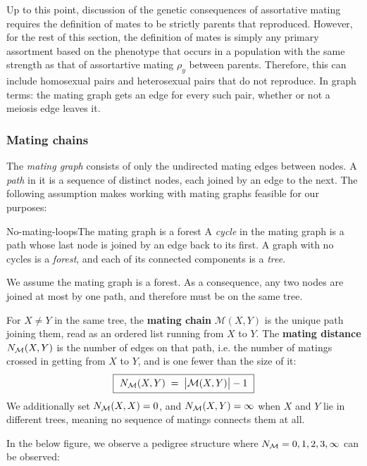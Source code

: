 \documentclass[12pt]{article}
\renewcommand{\Mu}{\mathcal{M}}
\begin{document}
Up to this point, discussion of the genetic consequences of assortative mating requires the definition of mates to be strictly parents that reproduced.
However, for the rest of this section, the definition of mates is simply any primary assortment based on the phenotype that occurs in a population with the same strength as that of assortartive mating $\rho_y$ between parents.
Therefore, this can include homosexual pairs and heterosexual pairs that do not reproduce.
In graph terms: the mating graph gets an edge for every such pair, whether or not a meiosis edge leaves it.

\subsubsection{Mating chains}
The \emph{mating graph} consists of only the undirected mating edges between nodes.
A \emph{path} in it is a sequence of distinct nodes, each joined by an edge to the next.
The following assumption makes working with mating graphs feasible for our purposes:


\begin{assumption}{No-mating-loops}{The mating graph is a forest}
    A \emph{cycle} in the mating graph is a path whose last node is joined by an edge back to its first.
    A graph with no cycles is a \emph{forest}, and each of its connected components is a \emph{tree}.

    We assume the mating graph is a forest.
    As a consequence, any two nodes are joined at most by one path, and therefore must be on the same tree.
\end{assumption}

For $X \neq Y$ in the same tree, the \textbf{mating chain} $\Mu(X,Y)$ is the unique path joining them, read as an ordered list running from $X$ to $Y$.
The \textbf{mating distance} $N_{\mathcal{M}}(X,Y)$ is the number of edges on that path, i.e. the number of matings crossed in getting from $X$ to $Y$, and is one fewer than the size of it:
\begin{equation}\label{eq:mating-dist}
    \boxed{\ \Nmu(X,Y) \;=\; \big|\Mu(X,Y)\big| - 1 \ }
\end{equation}
We additionally set $N_{\mathcal{M}}(X,X) = 0$, and $N_{\mathcal{M}}(X,Y) = \infty$ when $X$ and $Y$ lie in different trees, meaning no sequence of matings connects them at all.

In the below figure, we observe a pedigree structure where $N_{\mathcal{M}} = 0, 1, 2, 3, \infty$ can be observed:
\end{document}
